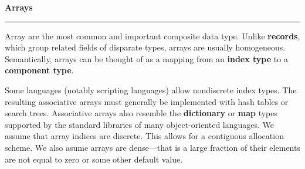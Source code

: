 \nopagenumbers
{\bf Arrays}
\vskip 1mm
\hrule

\vskip 6pt
Array are the most common and important composite data type. Unlike {\bf records}, which group related fields of disparate types, arrays are usually homogeneous. Semantically, arrays can be thought of as a mapping from an {\bf index type} to a {\bf component type}.

\vskip 6pt
Some languages (notably scripting languages) allow nondiscrete index types. The resulting {associative arrays} must generally be implemented with hash tables or search trees. Associative arrays also resemble the {\bf dictionary} or {\bf map} types supported by the standard libraries of many object-oriented languages. We assume that array indices are discrete. This allows for a contiguous allocation scheme. We also asume arrays are dense---that is a large fraction of their elements  are not equal to zero or some other default value.

\vfill\eject
\bye
